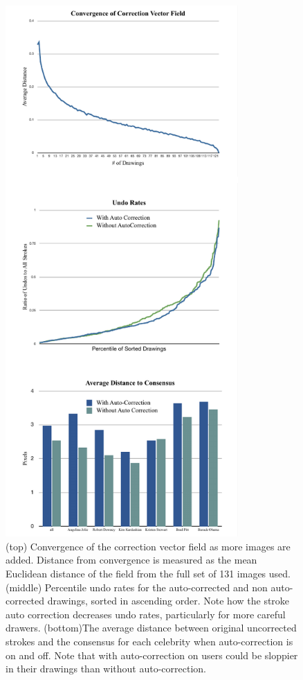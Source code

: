 \begin{figure}
  \centering%
\includegraphics[width=3.5in]{./figures/userstudy/threeGraphs.pdf}
  \caption{(top) Convergence of the correction vector field as more images are added. Distance from convergence is measured as the mean Euclidean distance of the field from the full set of 131 images used.  (middle) Percentile undo rates for the auto-corrected and non auto-corrected drawings, sorted in ascending order. Note how the stroke auto correction decreases undo rates, particularly for more careful drawers. (bottom)The average distance between original uncorrected strokes and the consensus for each celebrity when auto-correction is on and off. Note that with auto-correction on users could be sloppier in their drawings than without auto-correction.}
  \label{fig:daf-three}
\end{figure}

